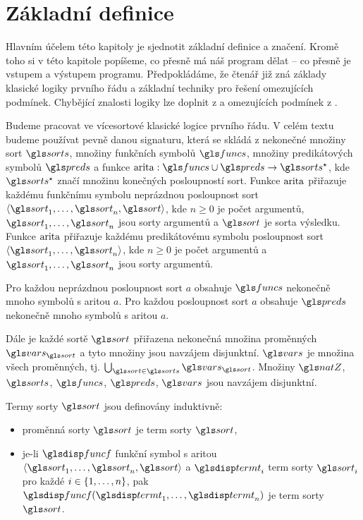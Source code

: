 \chapter{Základní definice}

Hlavním účelem této kapitoly je sjednotit základní definice a značení.
Kromě toho si v této kapitole popíšeme,
co přesně má náš program dělat -- co přesně je vstupem a výstupem programu.
Předpokládáme, že čtenář již zná základy klasické logiky prvního
řádu a základní techniky pro řešení omezujících podmínek.
Chybějící znalosti logiky lze doplnit z
\cite{enderton2001logic} a omezujících podmínek z
\cite{dechter2003constraints}.

Budeme pracovat ve vícesortové klasické logice prvního řádu.
V celém textu budeme
používat pevně danou signaturu, která se skládá z nekonečné množiny sort
$\sorts$, množiny funkčních symbolů $\funcs$, množiny predikátových symbolů
$\preds$ a funkce $\arity: \funcs \cup \preds \to \sorts^\star$,
kde $\sorts^\star$ značí množinu konečných posloupností sort.
Funkce $\operatorname{arita}$ přiřazuje každému funkčnímu symbolu neprázdnou posloupnost
sort $\langle \sort_1 \comdots \sort_n, \sort \rangle$,
kde $n \ge 0$ je počet argumentů,
$\sort_1 \comdots \sort_n$ jsou sorty argumentů a $\sort$ je sorta výsledku.
Funkce $\operatorname{arita}$ přiřazuje každému predikátovému symbolu posloupnost
sort $\langle \sort_1 \comdots \sort_n \rangle$, kde $n \ge 0$
je počet argumentů a $\sort_1 \comdots \sort_n$ jsou sorty argumentů.

Pro každou neprázdnou posloupnost sort $a$ obsahuje $\funcs$ nekonečně
mnoho symbolů s aritou $a$. Pro každou posloupnost sort $a$ obsahuje
$\preds$ nekonečně mnoho symbolů s aritou $a$.

Dále je každé sortě $\sort$ přiřazena nekonečná množina proměnných
$\vars_\sort$ a tyto množiny jsou navzájem disjunktní.
$\vars$ je množina všech proměnných,
tj. $\bigcup_{\sort \in \sorts} \vars_\sort$. Množiny $\natZ$, $\sorts$, $\funcs$,
$\preds$, $\vars$ jsou navzájem disjunktní.

Termy sorty $\sort$ jsou definovány induktivně:

\begin{itemize}
\item proměnná sorty $\sort$ je term sorty $\sort$,
\item je-li $\func$ funkční symbol s aritou
  $\langle \sort_1 \comdots \sort_n, \sort \rangle$
  a $\term_i$ term sorty $\sort_i$ pro každé $i \in \{ 1 , \ldots, n \}$, pak
  $\func(\term_1 \comdots \term_n)$ je term sorty $\sort$.
\end{itemize}

